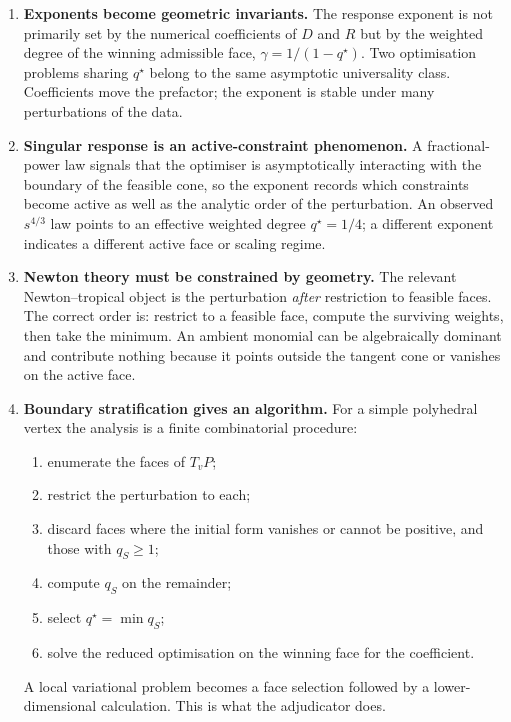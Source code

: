 \documentclass[11pt]{article}
\theoremstyle{definition}
\theoremstyle{remark}
\begin{document}
\begin{enumerate}[wide=0pt]

\item \textbf{Exponents become geometric invariants.}
The response exponent is not primarily set by the numerical coefficients of
$D$ and $R$ but by the weighted degree of the winning admissible face,
$\gamma=1/(1-q^\star)$. Two optimisation problems sharing $q^\star$ belong to
the same asymptotic universality class. Coefficients move the prefactor; the
exponent is stable under many perturbations of the data.

\item \textbf{Singular response is an active-constraint phenomenon.}
A fractional-power law signals that the optimiser is asymptotically
interacting with the boundary of the feasible cone, so the exponent records
which constraints become active as well as the analytic order of the
perturbation. An observed $s^{4/3}$ law points to an effective weighted degree
$q^\star=1/4$; a different exponent indicates a different active face or
scaling regime.

\item \textbf{Newton theory must be constrained by geometry.}
The relevant Newton--tropical object is the perturbation \emph{after}
restriction to feasible faces. The correct order is: restrict to a feasible
face, compute the surviving weights, then take the minimum. An ambient
monomial can be algebraically dominant and contribute nothing because it
points outside the tangent cone or vanishes on the active face.

\item \textbf{Boundary stratification gives an algorithm.}
For a simple polyhedral vertex the analysis is a finite combinatorial
procedure:
\begin{enumerate}[nosep,label=(\alph*)]
  \item enumerate the faces of $T_vP$;
  \item restrict the perturbation to each;
  \item discard faces where the initial form vanishes or cannot be positive,
        and those with $q_S\ge1$;
  \item compute $q_S$ on the remainder;
  \item select $q^\star=\min q_S$;
  \item solve the reduced optimisation on the winning face for the
        coefficient.
\end{enumerate}
A local variational problem becomes a face selection followed by a
lower-dimensional calculation. This is what the adjudicator does.


\end{enumerate}
\end{document}
